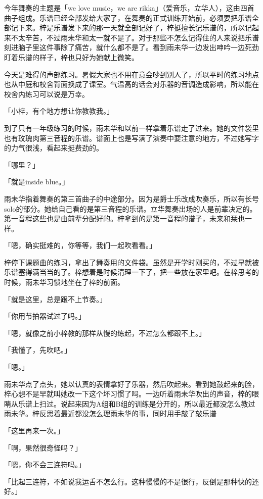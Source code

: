 \documentclass[UTF8]{ctexart}
\begin{document}
    今年舞奏的主题是「we love music，we are rikka」（爱音乐，立华人），这由四首曲子组成。乐谱已经全部发给大家了，在舞奏的正式训练开始前，必须要把乐谱全部记下来。梓是乐谱发下来的那一天就全部记好了，梓挺擅长记乐谱的，所以记起来不太辛苦，不过雨未华和太一就不是了。对于那些不怎么记得住的人来说把乐谱刻进脑子里这件事除了痛苦，就什么都不是了。看到雨未华一边发出呻吟一边死劲盯着乐谱的样子，梓也只好为她献上微笑。

    今天是难得的声部练习。暑假大家也不用在意会吵到别人了，所以平时的练习地点也从中庭和校舍背面换成了课室。气温高的话会对乐器的音调造成影响，所以能在校舍内练习可以说是万幸。

    「小梓，有个地方想让你教教我。」

    到了只有一年级练习的时候，雨未华和以前一样拿着乐谱走了过来。她的文件袋里也有玫瑰肉第三音程的乐谱。谱面上也是写满了演奏中要注意的地方，不过她写字的力气很浅，看起来挺费劲的。

    「哪里？」

    「就是inside blue。」

    雨未华指着舞奏的第三首曲子的中途部分。因为是爵士乐改成吹奏乐，所以有长号solo的部分。她给自己看的是第三音程的乐谱。立华舞奏出场的人是前辈决定的。第一音程这些也是由前辈分配好的。梓拿到的是第一音程的谱子，未来和栞也一样。

    「嗯，确实挺难的，你等等，我们一起吹看看。」

    梓停下课题曲的练习，拿出了舞奏用的文件袋。虽然是开学时刚买的，不过早就被乐谱塞得满当当的了。梓想着是时候清理一下了，把一些放在家里吧。在梓思考的时候，雨未华习惯地坐在了梓的前面。

    「就是这里，总是跟不上节奏。」

    「你用节拍器试过了吗。」

    「嗯，就像之前小梓教的那样从慢的练起，不过怎么都跟不上。」

    「我懂了，先吹吧。」

    「嗯。」

    雨未华点了点头，她以认真的表情拿好了乐器，然后吹起来。看到她鼓起来的脸，梓心想不是早就叫她改一下这个坏习惯了吗。一边听着雨未华吹出的声音，梓的眼睛从乐谱上扫过。说起来因为A组和B组的训练是分开的，所以最近都没怎么教过雨未华。梓反思着最近都没怎么理雨未华的事，同时用手敲了敲乐谱

    「这里再来一次。」

    「啊，果然很奇怪吗？」

    「嗯，你不会三连符吗。」

    「比起三连符，不如说我运舌不怎么行。这种慢慢的不是很行，反倒是那种快的还好。」
\end{document}
